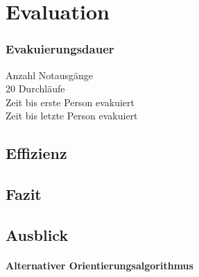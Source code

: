 \chapter{Evaluation}
\label{cha:evaluation}

\subsection{Evakuierungsdauer}

Anzahl Notausgänge\\
20 Durchläufe\\
Zeit bis erste Person evakuiert\\
Zeit bis letzte Person evakuiert\\


\section{Effizienz}

\section{Fazit}

\section{Ausblick}

\subsubsection{Alternativer Orientierungsalgorithmus}
\label{sec:bug-0}

